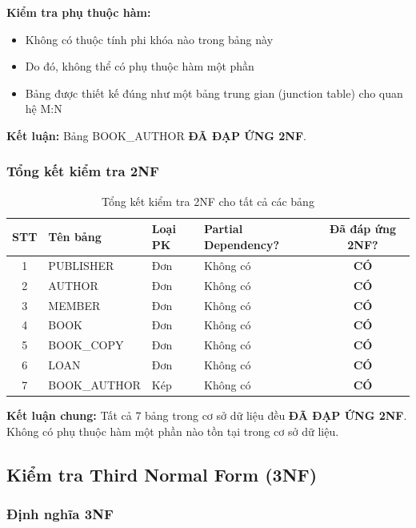 \documentclass[12pt,a4paper]{article}
\begin{document}
\textbf{Kiểm tra phụ thuộc hàm:}
\begin{itemize}
    \item Không có thuộc tính phi khóa nào trong bảng này
    \item Do đó, không thể có phụ thuộc hàm một phần
    \item Bảng được thiết kế đúng như một bảng trung gian (junction table) cho quan hệ M:N
\end{itemize}

\textbf{Kết luận:} Bảng BOOK\_AUTHOR \textbf{ĐÃ ĐẠP ỨNG 2NF}.

\subsubsection{Tổng kết kiểm tra 2NF}

\begin{table}[H]
\centering
\caption{Tổng kết kiểm tra 2NF cho tất cả các bảng}
\begin{tabular}{|c|l|l|l|c|}
\hline
\textbf{STT} & \textbf{Tên bảng} & \textbf{Loại PK} & \textbf{Partial Dependency?} & \textbf{Đã đáp ứng 2NF?} \\ \hline
1 & PUBLISHER & Đơn & Không có & \textbf{CÓ} \\ \hline
2 & AUTHOR & Đơn & Không có & \textbf{CÓ} \\ \hline
3 & MEMBER & Đơn & Không có & \textbf{CÓ} \\ \hline
4 & BOOK & Đơn & Không có & \textbf{CÓ} \\ \hline
5 & BOOK\_COPY & Đơn & Không có & \textbf{CÓ} \\ \hline
6 & LOAN & Đơn & Không có & \textbf{CÓ} \\ \hline
7 & BOOK\_AUTHOR & Kép & Không có & \textbf{CÓ} \\ \hline
\end{tabular}
\end{table}

\textbf{Kết luận chung:} Tất cả 7 bảng trong cơ sở dữ liệu đều \textbf{ĐÃ ĐẠP ỨNG 2NF}. Không có phụ thuộc hàm một phần nào tồn tại trong cơ sở dữ liệu.

\subsection{Kiểm tra Third Normal Form (3NF)}

\subsubsection{Định nghĩa 3NF}
\end{document}
